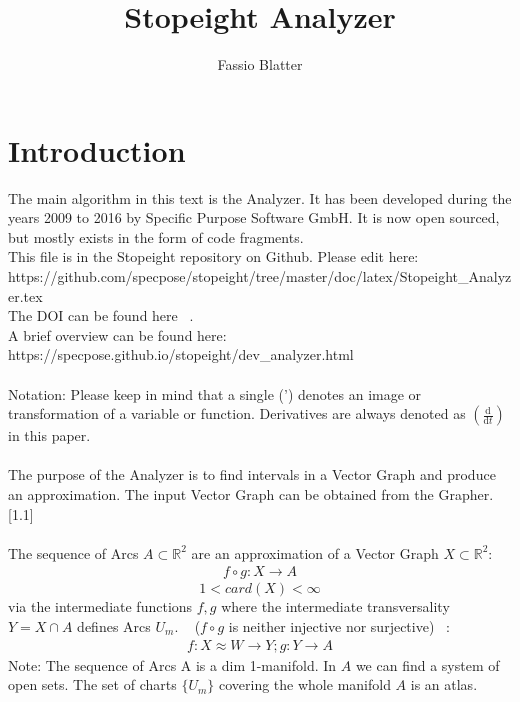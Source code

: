 \documentclass{report}
\begin{document}
\title{Stopeight Analyzer}
\author{Fassio Blatter}
\maketitle

\chapter{Introduction}
The main algorithm in this text is the Analyzer. It has been developed during the years 2009 to 2016 by Specific Purpose Software GmbH. It is now open sourced, but mostly exists in the form of code fragments.\\
This file is in the Stopeight repository on Github. Please edit here:\\
https://github.com/specpose/stopeight/tree/master/doc/latex/Stopeight\_Analyzer.tex\\
The DOI can be found here ~\cite{Analyzer}.\\
A brief overview can be found here:\\
https://specpose.github.io/stopeight/dev\_analyzer.html\\\\
Notation: Please keep in mind that a single (') denotes an image or transformation of a variable or function. Derivatives are always denoted as $(\frac{\mathrm{d}}{\mathrm{d}t})$ in this paper.\\\\
The purpose of the Analyzer is to find intervals in a Vector Graph and produce an approximation. The input Vector Graph can be obtained from the Grapher. \cite{Grapher}[1.1]\\\\
The sequence of Arcs $A \subset \mathbb{R}^2$ are an approximation of a Vector Graph $X \subset \mathbb{R}^2$:
\begin{align}
f \circ g: X \rightarrow A
\end{align}
\begin{equation*}
1 < card(X) < \infty
\end{equation*}
via the intermediate functions $f,g$ where the intermediate transversality $Y = X \cap A$ defines Arcs $U_{m}$. ~\cite[9.9]{Loring} ($f \circ g$ is neither injective nor surjective) ~\cite[2.1]{LauresSzymik}:
\begin{align}
f: X \approx W \rightarrow Y; g: Y \rightarrow A
\end{align}
Note: The sequence of Arcs A is a dim 1-manifold. In $A$ we can find a system of open sets. The set of charts $\{U_{m}\}$ covering the whole manifold $A$ is an atlas. ~\cite[3.1.1.]{Fomenko} ~\cite[4.5]{Wall}
\end{document}
